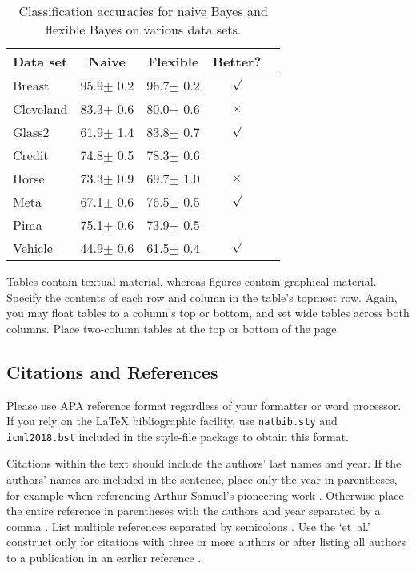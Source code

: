\documentclass{article}
\begin{document}
\begin{table}[t]
\caption{Classification accuracies for naive Bayes and flexible
Bayes on various data sets.}
\label{sample-table}
\vskip 0.15in
\begin{center}
\begin{small}
\begin{sc}
\begin{tabular}{lcccr}
\toprule
Data set & Naive & Flexible & Better? \\
\midrule
Breast    & 95.9$\pm$ 0.2& 96.7$\pm$ 0.2& $\surd$ \\
Cleveland & 83.3$\pm$ 0.6& 80.0$\pm$ 0.6& $\times$\\
Glass2    & 61.9$\pm$ 1.4& 83.8$\pm$ 0.7& $\surd$ \\
Credit    & 74.8$\pm$ 0.5& 78.3$\pm$ 0.6&         \\
Horse     & 73.3$\pm$ 0.9& 69.7$\pm$ 1.0& $\times$\\
Meta      & 67.1$\pm$ 0.6& 76.5$\pm$ 0.5& $\surd$ \\
Pima      & 75.1$\pm$ 0.6& 73.9$\pm$ 0.5&         \\
Vehicle   & 44.9$\pm$ 0.6& 61.5$\pm$ 0.4& $\surd$ \\
\bottomrule
\end{tabular}
\end{sc}
\end{small}
\end{center}
\vskip -0.1in
\end{table}

Tables contain textual material, whereas figures contain graphical material.
Specify the contents of each row and column in the table's topmost
row. Again, you may float tables to a column's top or bottom, and set
wide tables across both columns. Place two-column tables at the
top or bottom of the page.

\subsection{Citations and References}

Please use APA reference format regardless of your formatter
or word processor. If you rely on the \LaTeX\/ bibliographic
facility, use \texttt{natbib.sty} and \texttt{icml2018.bst}
included in the style-file package to obtain this format.

Citations within the text should include the authors' last names and
year. If the authors' names are included in the sentence, place only
the year in parentheses, for example when referencing Arthur Samuel's
pioneering work . Otherwise place the entire
reference in parentheses with the authors and year separated by a
comma \cite{Samuel59}. List multiple references separated by
semicolons \cite{kearns89,Samuel59,mitchell80}. Use the `et~al.'
construct only for citations with three or more authors or after
listing all authors to a publication in an earlier reference \cite{MachineLearningI}.
\end{document}
